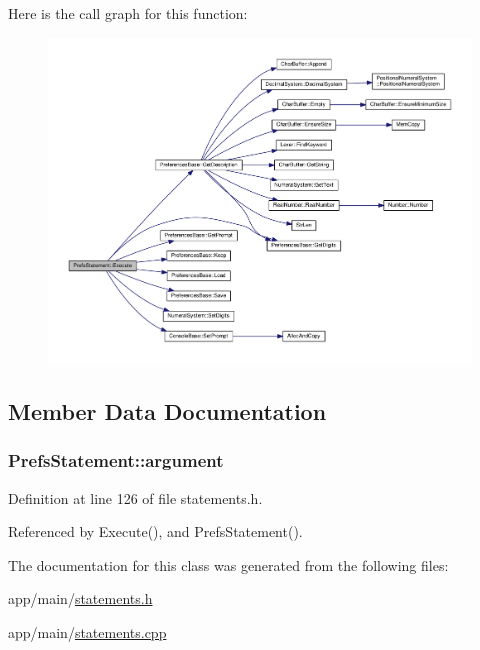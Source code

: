 Here is the call graph for this function\+:\nopagebreak
\begin{figure}[H]
\begin{center}
\leavevmode
\includegraphics[width=350pt]{classPrefsStatement_ac53922eb842ba389957300fef95cd98f_cgraph}
\end{center}
\end{figure}




\subsection{Member Data Documentation}
\subsubsection[{\texorpdfstring{argument}{argument}}]{ Prefs\+Statement\+::argument\hspace{0.3cm}{\ttfamily [private]}}\hypertarget{classPrefsStatement_a97e5e2a6f13e06ae966bd32afad5ab48}{}\label{classPrefsStatement_a97e5e2a6f13e06ae966bd32afad5ab48}


Definition at line 126 of file statements.\+h.



Referenced by Execute(), and Prefs\+Statement().



The documentation for this class was generated from the following files\+:\begin{DoxyCompactItemize}
\item 
app/main/\hyperlink{statements_8h}{statements.\+h}\item 
app/main/\hyperlink{statements_8cpp}{statements.\+cpp}\end{DoxyCompactItemize}
